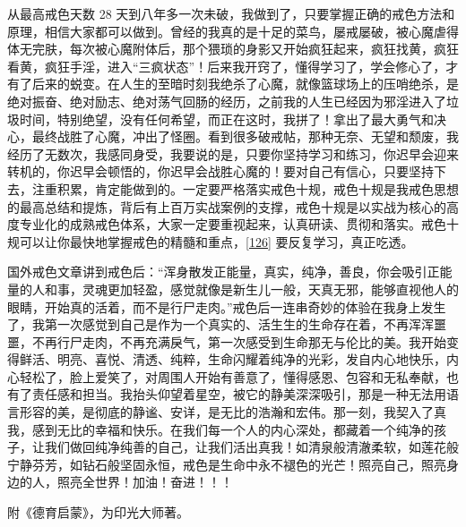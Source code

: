 从最高戒色天数 28 天到八年多一次未破，我做到了，只要掌握正确的戒色方法和原理，相信大家都可以做到。曾经的我真的是十足的菜鸟，屡戒屡破，被心魔虐得体无完肤，每次被心魔附体后，那个猥琐的身影又开始疯狂起来，疯狂找黄，疯狂看黄，疯狂手淫，进入“三疯状态”！后来我开窍了，懂得学习了，学会修心了，才有了后来的蜕变。在人生的至暗时刻我绝杀了心魔，就像篮球场上的压哨绝杀，是绝对振奋、绝对励志、绝对荡气回肠的经历，之前我的人生已经因为邪淫进入了垃圾时间，特别绝望，没有任何希望，而正在这时，我拼了！拿出了最大勇气和决心，最终战胜了心魔，冲出了怪圈。看到很多破戒帖，那种无奈、无望和颓废，我经历了无数次，我感同身受，我要说的是，只要你坚持学习和练习，你迟早会迎来转机的，你迟早会顿悟的，你迟早会战胜心魔的！要对自己有信心，只要坚持下去，注重积累，肯定能做到的。一定要严格落实戒色十规，戒色十规是我戒色思想的最高总结和提炼，背后有上百万实战案例的支撑，戒色十规是以实战为核心的高度专业化的成熟戒色体系，大家一定要重视起来，认真研读、贯彻和落实。戒色十规可以让你最快地掌握戒色的精髓和重点，\ref{126} 要反复学习，真正吃透。

国外戒色文章讲到戒色后：“浑身散发正能量，真实，纯净，善良，你会吸引正能量的人和事，灵魂更加轻盈，感觉就像是新生儿一般，天真无邪，能够直视他人的眼睛，开始真的活着，而不是行尸走肉。”戒色后一连串奇妙的体验在我身上发生了，我第一次感觉到自己是作为一个真实的、活生生的生命存在着，不再浑浑噩噩，不再行尸走肉，不再充满戾气，第一次感受到生命那无与伦比的美。我开始变得鲜活、明亮、喜悦、清透、纯粹，生命闪耀着纯净的光彩，发自内心地快乐，内心轻松了，脸上爱笑了，对周围人开始有善意了，懂得感恩、包容和无私奉献，也有了责任感和担当。我抬头仰望着星空，被它的静美深深吸引，那是一种无法用语言形容的美，是彻底的静谧、安详，是无比的浩瀚和宏伟。那一刻，我契入了真我，感到无比的幸福和快乐。在我们每一个人的内心深处，都藏着一个纯净的孩子，让我们做回纯净纯善的自己，让我们活出真我！如清泉般清澈柔软，如莲花般宁静芬芳，如钻石般坚固永恒，戒色是生命中永不褪色的光芒！照亮自己，照亮身边的人，照亮全世界！加油！奋进！！！

附《德育启蒙》，为印光大师著。

